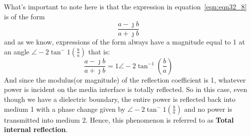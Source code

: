 What's important to note here is that the expression in equation~\ref{eqn:eqn32_8} is of the form
\begin{equation}
\frac{a - \jmath b}{a + \jmath b}
\end{equation}
and as we know, expressions of the form always have a magnitude equal  to 1 at an angle $\angle-2\tan^-{1}(\frac{b}{a})$ that is:
\begin{equation}
\frac{a - \jmath b}{a + \jmath b} = 1\angle - 2\tan^{-1}(\frac{b}{a})
\end{equation} 
And since the modulus(or magnitude) of the reflection coefficient is 1, whatever power is incident on the media interface is totally reflected.
So in this case, even though we have a dielectric boundary, the entire power is reflected back into medium 1 with a phase change given by $\angle-2\tan^-{1}(\frac{b}{a})$ and no power is transmitted into medium 2. Hence, this phenomenon is referred to as \textbf{Total internal reflection}.

